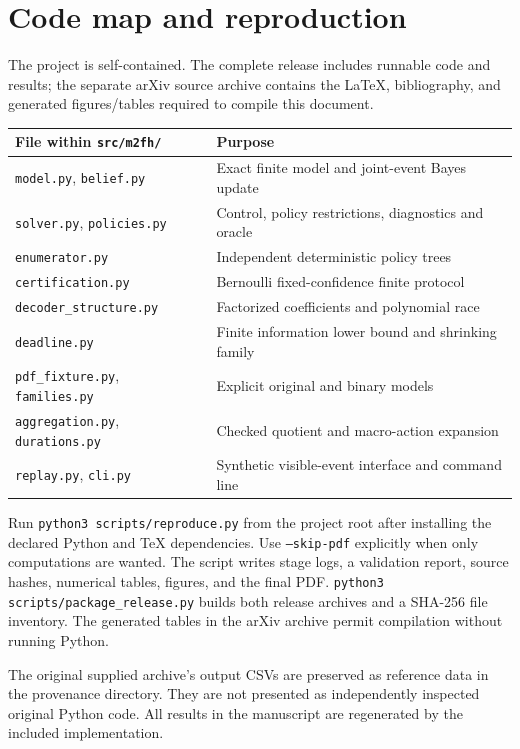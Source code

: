 \section{Code map and reproduction}
\label{app:code-map}
The project is self-contained. The complete release includes runnable code
and results; the separate arXiv source archive contains the LaTeX, bibliography,
and generated figures/tables required to compile this document.
{\small
\begin{longtable}{p{.44\linewidth}p{.48\linewidth}}
\toprule
File within \texttt{src/m2fh/} & Purpose\\\midrule
\texttt{model.py}, \texttt{belief.py} & Exact finite model and joint-event Bayes update\\
\texttt{solver.py}, \texttt{policies.py} & Control, policy restrictions, diagnostics and oracle\\
\texttt{enumerator.py} & Independent deterministic policy trees\\
\texttt{certification.py} & Bernoulli fixed-confidence finite protocol\\
\texttt{decoder\_structure.py} & Factorized coefficients and polynomial race\\
\texttt{deadline.py} & Finite information lower bound and shrinking family\\
\texttt{pdf\_fixture.py}, \texttt{families.py} & Explicit original and binary models\\
\texttt{aggregation.py}, \texttt{durations.py} & Checked quotient and macro-action expansion\\
\texttt{replay.py}, \texttt{cli.py} & Synthetic visible-event interface and command line\\
\bottomrule
\end{longtable}}
Run \texttt{python3 scripts/reproduce.py} from the project root after installing
the declared Python and TeX dependencies. Use \texttt{--skip-pdf} explicitly
when only computations are wanted. The script writes stage logs, a validation
report, source hashes, numerical tables, figures, and the final PDF.
\texttt{python3 scripts/package\_release.py} builds both release archives and
a SHA-256 file inventory. The generated tables in the arXiv archive permit
compilation without running Python.

The original supplied archive's output CSVs are preserved as reference data
in the provenance directory. They are not
presented as independently inspected original Python code. All results in
the manuscript are regenerated by the included implementation.
